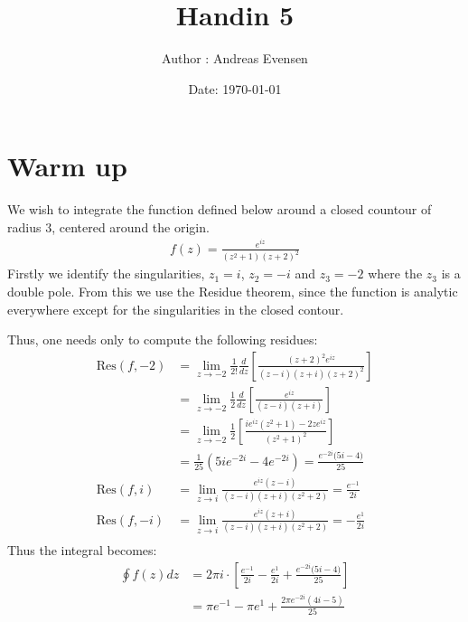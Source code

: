 \documentclass{article}
\title{Handin 5}
\author{Author : Andreas Evensen}
\date{Date: \today}
\begin{document}
\maketitle

\section{Warm up}
We wish to integrate the function defined below around a closed countour of radius $3$, centered around the origin.
\begin{align*}
    f(z) = \frac{e^{iz}}{(z^2 + 1)(z + 2)^2}
\end{align*}Firstly we identify the singularities, $z_1 = i$, $z_2 = -i$ and $z_3 = -2$ where the $z_3$ is a double pole. From this we use the Residue theorem, since the function is analytic everywhere except for the singularities in the closed contour.

Thus, one needs only to compute the following residues:
\begin{align*}
    \text{Res}(f, -2) &= \lim_{z\to -2}\frac{1}{2!} \frac{d}{dz}\left[\frac{(z+2)^2e^{iz}}{(z-i)(z+i)(z+2)^2}\right]\\
    &=\lim_{z\to -2}\frac{1}{2}\frac{d}{dz}\left[\frac{e^{iz}}{(z-i)(z+i)}\right]\\
    &=\lim_{z\to-2}\frac{1}{2}\left[\frac{ie^{iz}(z^2 + 1)-2ze^{iz}}{(z^2 + 1)^2}\right]\\
    &=\frac{1}{25}\left(5ie^{-2i} - 4e^{-2i}\right) = \frac{e^{-2i}\big(5i - 4\big)}{25}\\
    \text{Res}(f, i) &=\lim_{z\to i}\frac{e^{iz}(z-i)}{(z-i)(z+i)(z^2 + 2)} = \frac{e^{-1}}{2i}\\
    \text{Res}(f, -i) &=\lim_{z\to i}\frac{e^{iz}(z+i)}{(z-i)(z+i)(z^2 + 2)} = -\frac{e^{1}}{2i}\\
\end{align*}Thus the integral becomes:
\begin{align*}
    \oint f(z)dz &= 2\pi i\cdot\left[\frac{e^{-1}}{2i} - \frac{e^{1}}{2i} + \frac{e^{-2i}\big(5i - 4\big)}{25}\right]\\
    &=\pi e^{-1} - \pi e^{1} + \frac{2\pi e^{-2i}(4i -5)} {25}
\end{align*}
\newpage
\end{document}
